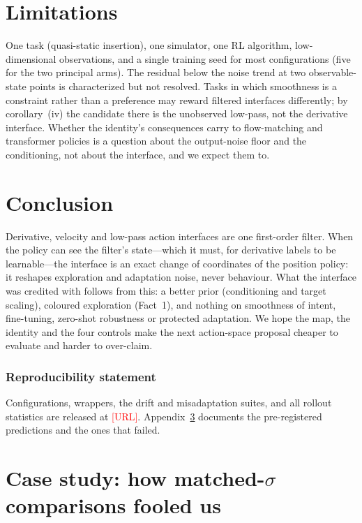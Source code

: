 \documentclass{article}
\newcommand{\todo}[1]{\textcolor{red}{[#1]}}
\begin{document}
\section{Limitations}

One task (quasi-static insertion), one simulator, one RL algorithm, low-dimensional observations, and a single training seed for most configurations (five for the two principal arms). The residual below the noise trend at two observable-state points is characterized but not resolved. Tasks in which smoothness is a constraint rather than a preference may reward filtered interfaces differently; by corollary~(iv) the candidate there is the unobserved low-pass, not the derivative interface. Whether the identity's consequences carry to flow-matching and transformer policies is a question about the output-noise floor and the conditioning, not about the interface, and we expect them to.

\section{Conclusion}

Derivative, velocity and low-pass action interfaces are one first-order filter. When the policy can see the filter's state---which it must, for derivative labels to be learnable---the interface is an exact change of coordinates of the position policy: it reshapes exploration and adaptation noise, never behaviour. What the interface was credited with follows from this: a better prior (conditioning and target scaling), coloured exploration (Fact~1), and nothing on smoothness of intent, fine-tuning, zero-shot robustness or protected adaptation. We hope the map, the identity and the four controls make the next action-space proposal cheaper to evaluate and harder to over-claim.

\subsubsection*{Reproducibility statement}
Configurations, wrappers, the drift and misadaptation suites, and all rollout statistics are released at \todo{URL}. Appendix~\ref{app:casestudy} documents the pre-registered predictions and the ones that failed.




\appendix

\section{Case study: how matched-$\sigma$ comparisons fooled us}
\label{app:casestudy}
\end{document}
